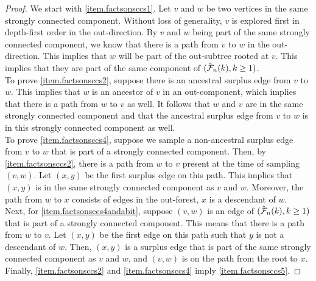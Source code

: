 \begin{proof}
We start with \ref{item.factsonsccs1}. Let $v$ and $w$ be two vertices in the same strongly connected component. Without loss of generality, $v$ is explored first in depth-first order in the out-direction. By $v$ and $w$ being part of the same strongly connected component, we know that there is a path from $v$ to $w$ in the out-direction. This implies that $w$ will be part of the out-subtree rooted at $v$. This implies that they are part of the same component of $(\hat{{\mathcal F}}_n(k),k\geq 1)$. \\
To prove \ref{item.factsonsccs2}, suppose there is an ancestral surplus edge from $v$ to $w$. This implies that $w$ is an ancestor of $v$ in an out-component, which implies that there is a path from $w$ to $v$ as well. It follows that $w$ and $v$ are in the same strongly connected component and that the ancestral surplus edge from $v$ to $w$ is in this strongly connected component as well. \\
To prove \ref{item.factsonsccs4}, suppose we sample a non-ancestral surplus edge from $v$ to $w$ that is part of a strongly connected component. Then, by \ref{item.factsonsccs2}, there is a path from $w$ to $v$ present at the time of sampling $(v,w)$. Let $(x,y)$ be the first surplus edge on this path. This implies that $(x,y)$ is in the same strongly connected component as $v$ and $w$. Moreover, the path from $w$ to $x$ consists of edges in the out-forest, $x$ is a descendant of $w$.\\
Next, for \ref{item.factsonsccs4andabit}, suppose $(v,w)$ is an edge of $(\hat{{\mathcal F}}_n(k),k\geq 1)$ that is part of a strongly connected component. This means that there is a path from $w$ to $v$. Let $(x,y)$ be the first edge on this path such that $y$ is not a descendant of $w$. Then, $(x,y)$ is a surplus edge that is part of the same strongly connected component as $v$ and $w$, and $(v,w)$ is on the path from the root to $x$. \\
Finally, \ref{item.factsonsccs2} and \ref{item.factsonsccs4} imply \ref{item.factsonsccs5}. 
\end{proof}

